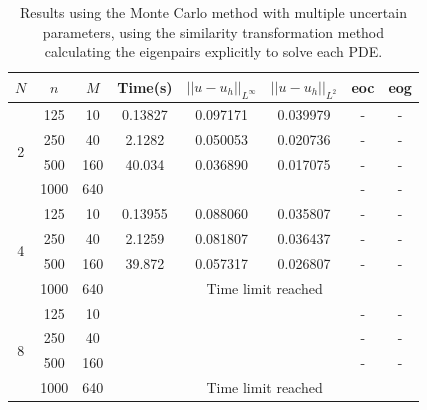 \documentclass[11pt]{article}
\numberwithin{equation}{section}
\begin{document}
\begin{table}[H]
\centering
\begin{tabular}{|c|c|c|c|c|c|c|c|}
\hline
$N$ & $n$ & $M$ & Time(s) & $|| u - u_h ||_{L^{\infty}}$ & $|| u - u_h ||_{L^{2}}$ & eoc & eog \\
\hline
\multirow{4}{*}{2} & 125 & 10 & 0.13827 & 0.097171 & 0.039979 & - & - \\
& 250 & 40 & 2.1282 & 0.050053 & 0.020736 & - & - \\
& 500 & 160 & 40.034 & 0.036890 & 0.017075 & - & - \\
& 1000 & 640 &  &  &  & - & - \\
\hline
\multirow{4}{*}{4} & 125 & 10 & 0.13955 & 0.088060 & 0.035807 & - & - \\
& 250 & 40 & 2.1259 & 0.081807 & 0.036437 & - & - \\
& 500 & 160 & 39.872 & 0.057317 & 0.026807 & - & - \\
\cline{4-8}
& 1000 & 640 & \multicolumn{5}{c|}{Time limit reached} \\
\hline
\multirow{4}{*}{8} & 125 & 10 &  &  &  & - & - \\
& 250 & 40 &  &  & & - & - \\
& 500 & 160 & & & & - & - \\
\cline{4-8}
& 1000 & 640 & \multicolumn{5}{c|}{Time limit reached} \\
\hline
\end{tabular}
\captionsetup{justification=centering}
\caption{Results using the Monte Carlo method with multiple uncertain parameters, using the similarity transformation method calculating the eigenpairs explicitly to solve each PDE.}
\label{table:monte carlo multiple}
\end{table}
\end{document}
